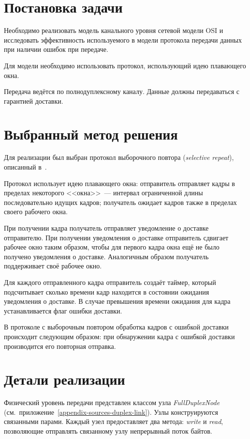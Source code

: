 \documentclass[a4paper,10pt]{article}
\newcommand{\myfunc}[1]{%
\textit{#1}}
\begin{document}


\tableofcontents
\pagebreak


\section{Постановка задачи}
Необходимо реализовать модель канального уровня сетевой модели OSI
и исследовать эффективность используемого в модели протокола передачи данных 
при наличии ошибок при передаче.

Для модели необходимо использовать протокол, 
использующий идею плавающего окна.

Передача ведётся по полнодуплексному каналу.
Данные должны передаваться с гарантией доставки.

\section{Выбранный метод решения}
Для реализации был выбран протокол выборочного повтора (\textit{selective repeat}), 
описанный в~\cite{tanenbaum2003compnet}.

Протокол использует идею плавающего окна:
отправитель отправляет кадры в пределах некоторого <<окна>>~--- 
интервал ограниченной длины последовательно идущих кадров;
получатель ожидает кадров также в пределах своего рабочего окна.

При получении кадра получатель отправляет уведомление о доставке 
отправителю.
При получении уведомления о доставке отправитель сдвигает рабочее окно
таким образом, чтобы для первого кадра окна ещё не было получено
уведомления о доставке.
Аналогичным образом получатель поддерживает своё рабочее окно.

Для каждого отправленного кадра отправитель создаёт таймер, 
который подсчитывает сколько времени кадр находится в состоянии ожидания
уведомления о доставке.
В случае превышения времени ожидания для кадра устанавливается флаг ошибки доставки.

В протоколе с выборочным повтором обработка кадров с ошибкой доставки 
происходит следующим образом:
при обнаружении кадра с ошибкой доставки производится его повторная отправка.

\section{Детали реализации}
Физический уровень передачи представлен классом узла \myfunc{FullDuplexNode}
(см.~приложение~\ref{appendix-sources-duplex-link}).
Узлы конструируются связанными парами.
Каждый узел предоставляет два метода: \myfunc{write} и \myfunc{read}, 
позволяющие отправлять связанному узлу непрерывный поток байтов.
\end{document}
